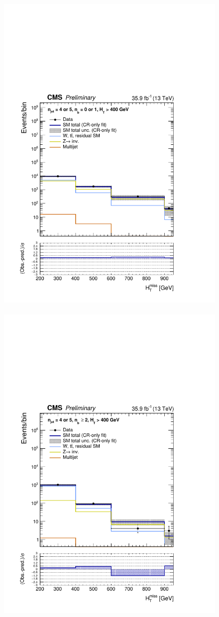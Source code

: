 \begin{figure}[h!]
  \centering
  \caption{
  }
  \includegraphics[width=0.49\linewidth]{figures/results/36invfb/aggregated/postFitShapeCR/mhtShape_eq01b_eq45j_400_Inf_crfit.pdf} ~
  \includegraphics[width=0.49\linewidth]{figures/results/36invfb/aggregated/postFitShapeCR/mhtShape_ge2b_eq45j_400_Inf_crfit.pdf} 
  \label{fig:aggregated_results3}
\end{figure}

